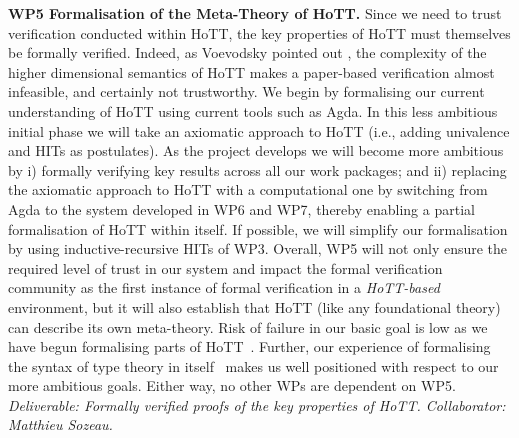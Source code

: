 \documentclass[a4paper,11pt]{article}
\newcommand{\eg}{{e.g.}\ }
\begin{document}
{\bf WP5 Formalisation of the Meta-Theory of HoTT.}  Since we need to
trust verification conducted within HoTT, the key properties of HoTT
must themselves be formally verified. Indeed, as Voevodsky pointed out
\cite{voevodsky-ias14}, the complexity of the higher dimensional
semantics of HoTT makes a paper-based verification almost infeasible,
and certainly not trustworthy. We begin by formalising our current
understanding of HoTT using current tools such as Agda. In this less
ambitious initial phase we will take an axiomatic approach to HoTT
(i.e., adding univalence and HITs as postulates). As the project
develops we will become more ambitious by i) formally verifying key
results across all our work packages; and ii) replacing the axiomatic
approach to HoTT with a computational one by switching from Agda to
the system developed in WP6 and WP7, thereby enabling a partial
formalisation of HoTT within itself. If possible, we will simplify our
formalisation by using inductive-recursive HITs of WP3.
Overall, WP5 will not only ensure the required level of trust in our
system and impact the formal verification community as the first
instance of formal verification in a {\em HoTT-based} environment, but
it will also establish that HoTT (like any foundational theory) can
describe its own meta-theory. Risk of failure in our basic goal is low
as we have begun formalising parts of HoTT~\cite{alti:csl12,AltenkirchLiRypacek14}. Further, our
experience of formalising the syntax of type theory in itself~\cite{mcbride:outrageous,ghani:fibredIR,alti:catind2} makes us well
positioned with respect to our more ambitious goals. Either way, no other WPs are
dependent on WP5. {\em Deliverable: Formally verified proofs of the
key properties of HoTT.  Collaborator: Matthieu Sozeau.  }


\end{document}
